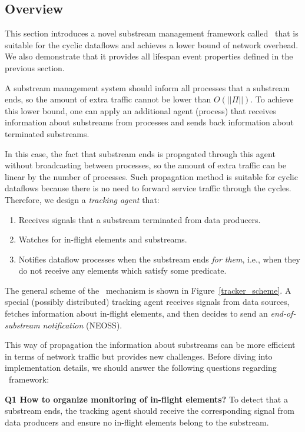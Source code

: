 \label{fs-acker-tracker}

\subsection{Overview}

This section introduces a novel substream management framework called \tracker\ that is suitable for the cyclic dataflows and achieves a lower bound of network overhead. We also demonstrate that it provides all lifespan event properties defined in the previous section.

A substream management system should inform all processes that a substream ends, so the amount of extra traffic cannot be lower than $O(||\Pi||)$. To achieve this lower bound, one can apply an additional agent (process) that receives information about substreams from processes and sends back information about terminated substreams. 

In this case, the fact that substream ends is propagated through this agent without broadcasting between processes, so the amount of extra traffic can be linear by the number of processes. Such propagation method is suitable for cyclic dataflows because there is no need to forward service traffic through the cycles. Therefore, we design a {\em tracking agent} that:

\begin{enumerate}
    \item Receives signals that a substream terminated from data producers.
    \item Watches for in-flight elements and substreams.
    \item Notifies dataflow processes when the substream ends {\em for them}, i.e., when they do not receive any elements which satisfy some predicate.
\end{enumerate}

The general scheme of the \tracker\ mechanism is shown in Figure~\ref{tracker_scheme}. A special (possibly distributed) tracking agent receives signals from data sources, fetches information about in-flight elements, and then decides to send an {\em end-of-substream notification} (NEOSS). 

This way of propagation the information about substreams can be more efficient in terms of network traffic but provides new challenges. Before diving into implementation details, we should answer the following questions regarding \tracker\ framework:

{\bf Q1 How to organize monitoring of in-flight elements?} To detect that a substream ends, the tracking agent should receive the corresponding signal from data producers and ensure no in-flight elements belong to the substream. 

